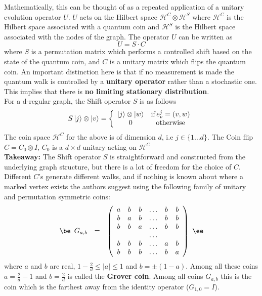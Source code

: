 \documentclass{article}
\newcommand{\Hi}{\mathcal{H}}
\begin{document}
Mathematically, this can be thought of as a repeated application of a unitary evolution operator $U$.  $U$
acts on the Hilbert space $\Hi^C \otimes \Hi^S$
where $\Hi^C$ is the Hilbert space associated with a quantum coin and $\Hi^S$ is the Hilbert space associated with the nodes of the graph.  The operator $U$ can be written as
\begin{equation}\label{Equation::WalkDef}
U = S \cdot C
\end{equation}
where $S$ is a permutation matrix which performs a controlled shift based on the state of the quantum coin, and $C$ is a unitary matrix which flips the quantum coin.
An important distinction here is that if no measurement is made the quantum walk is controlled by a \textbf{unitary operator} rather than a stochastic
one. This implies that there is \textbf{no limiting stationary distribution}. \\
For a d-regular graph, the Shift operator $S$ is as follows
\begin{equation}
    S \ket{j} \otimes \ket{v} =\left\{ \begin{array}{cc} \ket{j} \otimes \ket{w} & \mbox{if}\, e_v^j=(v,w) \\
0 & \mbox{otherwise} \end{array}\right.
\end{equation}
The coin space $\Hi^C$ for the above is of dimension $d$, i.e $j \in \{1 \ldots d\}$. The Coin flip $C = C_0 \otimes I$, $C_0$ is a $d\times d$ unitary acting on $\Hi^C$\\
\textbf{Takeaway:} The Shift operator $S$ is straightforward and constructed from the underlying graph structure, but there is a lot of freedom for the choice of $C$. Different $C$'s generate different walks, and if nothing is known about where a marked vertex exists the authors suggest using the following family of unitary and permutation symmetric coins: 
\begin{equation}
\be
\begin{array}{lcc} \label{Eq:grover}
G_{a,b}&=&\left( \begin{array}{cccccc}
a&b&b&\ldots &b&b\\
b&a&b& \ldots &b&b\\
b&b&a&\ldots &b&b\\
 &&& \ldots &\\
b&b&b&\ldots & a&b\\
b&b&b&\ldots &b& a \end{array} \right)
\end{array}
\ee
\end{equation}
where $a$ and $b$ are real, $1-\frac{2}{d} \leq |a| \leq 1$ and $b=\pm (1-a)$. Among all these coins $a=\frac{2}{d}-1$ and $b=\frac{2}{d}$ is called the \textbf{Grover coin}. Among all coins $G_{a,b}$ this is the coin which is the farthest away from the identity operator ($G_{1,0}=I$).
\end{document}
